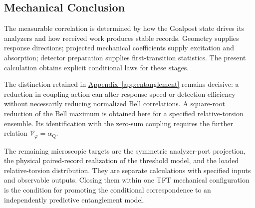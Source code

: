 \subsection{Mechanical Conclusion}
\label{sec:entanglement_conclusion}

The measurable correlation is determined by how the Goalpost state drives its analyzers and how received work produces stable records. Geometry supplies response directions; projected mechanical coefficients supply excitation and absorption; detector preparation supplies first-transition statistics. The present calculation obtains explicit conditional laws for these stages.

The distinction retained in \hyperref[app:entanglement]{Appendix~\ref*{app:entanglement}} remains decisive: a reduction in coupling action can alter response speed or detection efficiency without necessarily reducing normalized Bell correlations. A square-root reduction of the Bell maximum is obtained here for a specified relative-torsion ensemble. Its identification with the zero-sum coupling requires the further relation $\mathcal V_\varphi=\alpha_{\mathrm Q}$.

The remaining microscopic targets are the symmetric analyzer-port projection, the physical paired-record realization of the threshold model, and the loaded relative-torsion distribution. They are separate calculations with specified inputs and observable outputs. Closing them within one TFT mechanical configuration is the condition for promoting the conditional correspondence to an independently predictive entanglement model.
